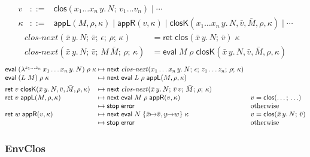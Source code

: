 \documentclass[10pt]{article}
\theoremstyle{acmplain}
\newcommand{\key}[1]{\mathsf{#1}}
\newcommand{\clos}[2]{\lambda^{#1}\, #2.\,}
\newcommand{\ev}[3]{\key{eval}\;#1\;#2\;#3}
\newcommand{\rt}[2]{\key{ret}\;#1\;#2}
\newcommand{\nxt}{\key{next}\;}
\newcommand{\stp}{\key{stop}\;}
\newcommand{\error}{\key{error}}
\newcommand{\closV}[2]{\key{clos}(#1;\, #2)}
\newcommand{\Kf}[2]{\key{#1}(#2)}
\newcommand{\cnext}{\mathit{clos\text{-}next}}
\begin{document}
\[
\begin{array}{rcl}
  v &::=& \closV{x_1 \ldots x_n\, y.\, N}{v_1 \ldots v_n} \mid \cdots \\
  \kappa &::=& \Kf{appL}{M, \rho, \kappa} \mid \Kf{appR}{v, \kappa}
    \mid \Kf{closK}{x_1 \ldots x_n\, y.\, N, \bar{v}, \bar{M}, \rho, \kappa} \mid \cdots
\end{array}
\]
\begin{align*}
  \cnext(\bar{x}\, y.\, N;\, \bar{v};\, \epsilon;\, \rho;\, \kappa) &= \rt{\closV{\bar{x}\, y.\, N}{\bar{v}}}{\kappa} \\
  \cnext(\bar{x}\, y.\, N;\, \bar{v};\, M\,\bar{M};\, \rho;\, \kappa) &=
    \ev{M}{\rho}{\Kf{closK}{\bar{x}\, y.\, N, \bar{v}, \bar{M}, \rho, \kappa}}
\end{align*}
\[
\begin{array}{@{}l@{\;\mapsto\;}l@{\quad}l@{}}
  \ev{(\clos{z_1 \ldots z_n}{x_1 \ldots x_n\, y} N)}{\rho}{\kappa} &
    \nxt \cnext(x_1 \ldots x_n\, y.\, N;\, \epsilon;\, z_1 \ldots z_n;\, \rho;\, \kappa) \\
  \ev{(L\;M)}{\rho}{\kappa} & \nxt \ev{L}{\rho}{\Kf{appL}{M, \rho, \kappa}} \\[1ex]
  \rt{v}{\Kf{closK}{\bar{x}\, y.\, N, \bar{v}, \bar{M}, \rho, \kappa}} &
    \nxt \cnext(\bar{x}\, y.\, N;\, \bar{v}\,v;\, \bar{M};\, \rho;\, \kappa) \\
  \rt{v}{\Kf{appL}{M, \rho, \kappa}} & \nxt \ev{M}{\rho}{\Kf{appR}{v, \kappa}} & v = \closV{\ldots}{\ldots} \\
  & \stp \error & \text{otherwise} \\
  \rt{w}{\Kf{appR}{v, \kappa}} & \nxt \ev{N}{\{\bar{x} {\mapsto} \bar{v}, y {\mapsto} w\}}{\kappa}
    & v = \closV{\bar{x}\, y.\, N}{\bar{v}} \\
  & \stp \error & \text{otherwise}
\end{array}
\]

\subsubsection{EnvClos}
\end{document}
